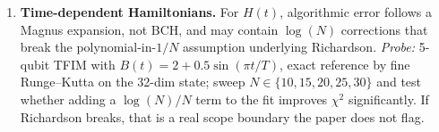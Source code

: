 \begin{enumerate}
  \item \textbf{Time-dependent Hamiltonians.}
        For $H(t)$, algorithmic error follows a Magnus expansion, not
        BCH, and may contain $\log(N)$ corrections that break the
        polynomial-in-$1/N$ assumption underlying Richardson.
        \emph{Probe:} 5-qubit TFIM with $B(t)=2+0.5\sin(\pi t/T)$,
        exact reference by fine Runge--Kutta on the 32-dim state;
        sweep $N\in\{10,15,20,25,30\}$ and test whether adding a
        $\log(N)/N$ term to the fit improves $\chi^2$
        significantly. If Richardson breaks, that is a real scope
        boundary the paper does not flag.
\end{enumerate}
